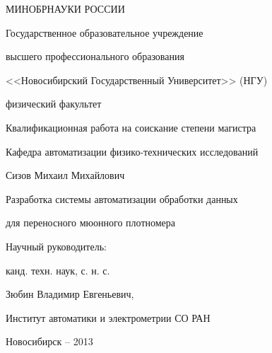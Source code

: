 \thispagestyle{empty}
\begin{large}


\begin{center}
МИНОБРНАУКИ РОССИИ\par
Государственное образовательное учреждение \par
высшего профессионального образования\par 
\end{center}



\begin{center}
<<Новосибирский Государственный Университет>> (НГУ)\par
\end{center}



\begin{center}
физический факультет
\end{center}

\vspace{10mm}
\begin{center}
Квалификационная работа на соискание степени магистра

Кафедра автоматизации физико-технических исследований
\end{center}

\vspace{15mm}
\begin{center}
Сизов Михаил Михайлович


Разработка системы автоматизации обработки данных 


для переносного мюонного плотномера
\end{center}

\vspace{20mm}
%

\begin{flushleft}

Научный руководитель:

канд. техн. наук, с. н. с.

Зюбин Владимир Евгеньевич,

Институт автоматики и электрометрии СО РАН



\end{flushleft}
\end{large}
\vspace{20mm}
\begin{center}
\large{Новосибирск -- 2013}
\end{center}

\newpage